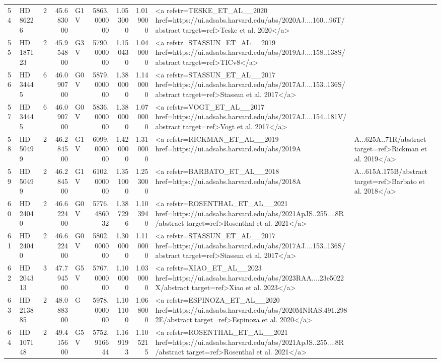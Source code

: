 \begin{tabular}{llrrlrrrl}
54 & HD 86226 & 2 & 45.683000 & G1 V & 5863.000000 & 1.053000 & 1.019000 & <a refstr=TESKE_ET_AL__2020 href=https://ui.adsabs.harvard.edu/abs/2020AJ....160...96T/abstract target=ref>Teske et al. 2020</a> \\
55 & HD 187123 & 2 & 45.954800 & G3 V & 5790.000000 & 1.150430 & 1.040000 & <a refstr=STASSUN_ET_AL__2019 href=https://ui.adsabs.harvard.edu/abs/2019AJ....158..138S/abstract target=ref>TICv8</a> \\
56 & HD 34445 & 6 & 46.090700 & G0 V & 5879.000000 & 1.380000 & 1.140000 & <a refstr=STASSUN_ET_AL__2017 href=https://ui.adsabs.harvard.edu/abs/2017AJ....153..136S/abstract target=ref>Stassun et al. 2017</a> \\
57 & HD 34445 & 6 & 46.090700 & G0 V & 5836.000000 & 1.380000 & 1.070000 & <a refstr=VOGT_ET_AL__2017 href=https://ui.adsabs.harvard.edu/abs/2017AJ....154..181V/abstract target=ref>Vogt et al. 2017</a> \\
58 & HD 50499 & 2 & 46.284500 & G1 V & 6099.000000 & 1.420000 & 1.310000 & <a refstr=RICKMAN_ET_AL__2019 href=https://ui.adsabs.harvard.edu/abs/2019A&A...625A..71R/abstract target=ref>Rickman et al. 2019</a> \\
59 & HD 50499 & 2 & 46.284500 & G1 V & 6102.000000 & 1.351000 & 1.253000 & <a refstr=BARBATO_ET_AL__2018 href=https://ui.adsabs.harvard.edu/abs/2018A&A...615A.175B/abstract target=ref>Barbato et al. 2018</a> \\
60 & HD 24040 & 2 & 46.622400 & G0 V & 5776.486032 & 1.387296 & 1.103940 & <a refstr=ROSENTHAL_ET_AL__2021 href=https://ui.adsabs.harvard.edu/abs/2021ApJS..255....8R/abstract target=ref>Rosenthal et al. 2021</a> \\
61 & HD 24040 & 2 & 46.622400 & G0 V & 5802.000000 & 1.300000 & 1.110000 & <a refstr=STASSUN_ET_AL__2017 href=https://ui.adsabs.harvard.edu/abs/2017AJ....153..136S/abstract target=ref>Stassun et al. 2017</a> \\
62 & HD 204313 & 3 & 47.794500 & G5 V & 5767.000000 & 1.100000 & 1.030000 & <a refstr=XIAO_ET_AL__2023 href=https://ui.adsabs.harvard.edu/abs/2023RAA....23e5022X/abstract target=ref>Xiao et al. 2023</a> \\
63 & HD 213885 & 2 & 48.088300 & G & 5978.000000 & 1.101100 & 1.068000 & <a refstr=ESPINOZA_ET_AL__2020 href=https://ui.adsabs.harvard.edu/abs/2020MNRAS.491.2982E/abstract target=ref>Espinoza et al. 2020</a> \\
64 & HD 107148 & 2 & 49.415600 & G5 V & 5752.916644 & 1.169193 & 1.105215 & <a refstr=ROSENTHAL_ET_AL__2021 href=https://ui.adsabs.harvard.edu/abs/2021ApJS..255....8R/abstract target=ref>Rosenthal et al. 2021</a> \\

\end{tabular}
